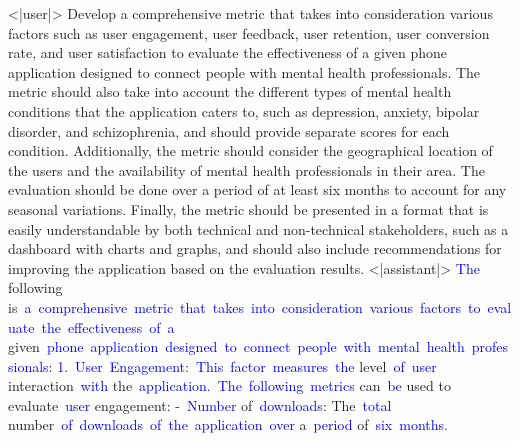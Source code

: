 \documentclass{article}
\begin{document}
\begin{tcolorbox}[colframe=black,colback=white]
<|user|>
Develop a comprehensive metric that takes into consideration various factors such as user engagement, user feedback, user retention, user conversion rate, and user satisfaction to evaluate the effectiveness of a given phone application designed to connect people with mental health professionals. The metric should also take into account the different types of mental health conditions that the application caters to, such as depression, anxiety, bipolar disorder, and schizophrenia, and should provide separate scores for each condition. Additionally, the metric should consider the geographical location of the users and the availability of mental health professionals in their area. The evaluation should be done over a period of at least six months to account for any seasonal variations. Finally, the metric should be presented in a format that is easily understandable by both technical and non-technical stakeholders, such as a dashboard with charts and graphs, and should also include recommendations for improving the application based on the evaluation results.
<|assistant|>
\textcolor{blue}{The} following is\textcolor{blue}{~a}\textcolor{blue}{~comprehensive}\textcolor{blue}{~metric}\textcolor{blue}{~that}\textcolor{blue}{~takes}\textcolor{blue}{~into}\textcolor{blue}{~consideration}\textcolor{blue}{~various}\textcolor{blue}{~factors}\textcolor{blue}{~to}\textcolor{blue}{~evaluate}\textcolor{blue}{~the}\textcolor{blue}{~effectiveness}\textcolor{blue}{~of}\textcolor{blue}{~a} given\textcolor{blue}{~phone}\textcolor{blue}{~application}\textcolor{blue}{~designed}\textcolor{blue}{~to}\textcolor{blue}{~connect}\textcolor{blue}{~people}\textcolor{blue}{~with}\textcolor{blue}{~mental}\textcolor{blue}{~health}\textcolor{blue}{~professionals}:
\textcolor{blue}{1}\textcolor{blue}{.}\textcolor{blue}{~User}\textcolor{blue}{~Engagement}:\textcolor{blue}{~This}\textcolor{blue}{~factor}\textcolor{blue}{~measures}\textcolor{blue}{~the} level\textcolor{blue}{~of}\textcolor{blue}{~user} interaction\textcolor{blue}{~with} the\textcolor{blue}{~application}\textcolor{blue}{.}\textcolor{blue}{~The}\textcolor{blue}{~following}\textcolor{blue}{~metrics} can\textcolor{blue}{~be} used to evaluate\textcolor{blue}{~user} engagement:
\textcolor{blue}{-}\textcolor{blue}{~Number} of\textcolor{blue}{~downloads}: The\textcolor{blue}{~total} number\textcolor{blue}{~of}\textcolor{blue}{~downloads}\textcolor{blue}{~of}\textcolor{blue}{~the}\textcolor{blue}{~application}\textcolor{blue}{~over} a\textcolor{blue}{~period} of\textcolor{blue}{~six}\textcolor{blue}{~months}\textcolor{blue}{.
}
\end{tcolorbox}
\end{document}
